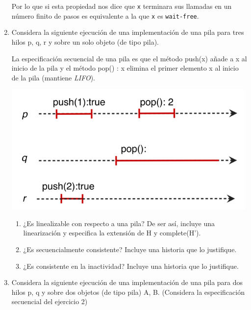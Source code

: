 \begin{enumerate}
    Por lo que si esta propiedad nos dice que \texttt{x} terminara sus llamadas en un número finito de pasos es equivalente a la que \texttt{x} es \texttt{wait-free}.
    
    \hfill

    \item Considera la siguiente ejecución de una implementación de una pila para tres hilos p, q, r y sobre un solo objeto (de tipo pila).
    
    La especificación secuencial de una pila es que el método push(x) añade a x al inicio de la pila y el método pop() : x elimina el primer elemento x al inicio de la pila (mantiene \textit{LIFO}).

    \begin{center}
        \includegraphics[width = 12 cm]{Images/Pregunta3_3.png}
    \end{center}

    \begin{enumerate}
        \item ¿Es linealizable con respecto a una pila? De ser así, incluye una 
        linearización y especifica la extensión de H y complete(H').

        \hfill

        \item ¿Es secuencialmente consistente? Incluye una historia que lo justifique.

        \hfill

        \item ¿Es consistente en la inactividad? Incluye una historia que lo justifique.

        \hfill
        
    \end{enumerate}

    \item Considera la siguiente ejecución de una implementación de una pila para dos hilos p, q y sobre dos objetos (de tipo pila) A, B. (Considera la especificación secuencial del ejercicio 2)


\end{enumerate}
